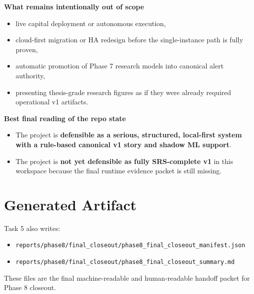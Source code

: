 \documentclass{article}
\begin{document}
\textbf{What remains intentionally out of scope}
\begin{itemize}
\item live capital deployment or autonomous execution,
\item cloud-first migration or HA redesign before the single-instance path is fully proven,
\item automatic promotion of Phase 7 research models into canonical alert authority,
\item presenting thesis-grade research figures as if they were already required operational v1 artifacts.
\end{itemize}

\textbf{Best final reading of the repo state}
\begin{itemize}
\item The project is \textbf{defensible as a serious, structured, local-first system with a rule-based canonical v1 story and shadow ML support}.
\item The project is \textbf{not yet defensible as fully SRS-complete v1} in this workspace because the final runtime evidence packet is still missing.
\end{itemize}

\section*{Generated Artifact}
Task 5 also writes:
\begin{itemize}
\item \texttt{reports/phase8/final\_closeout/phase8\_final\_closeout\_manifest.json}
\item \texttt{reports/phase8/final\_closeout/phase8\_final\_closeout\_summary.md}
\end{itemize}

These files are the final machine-readable and human-readable handoff packet for Phase 8 closeout.
\end{document}
